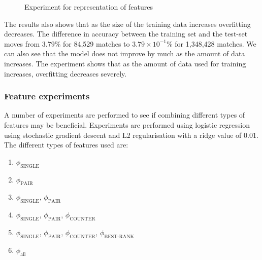 \begin{figure}[!htb]
  \centering
{}
  \caption{Experiment for representation of features}\label{fig:clusterbigdata}
\end{figure}

The results also shows that as the size of the training data increases overfitting decreases. The difference in accuracy between the training set and the test-set moves from $3.79\%$ for 84,529 matches to $3.79\times10^{-1} \%$ for 1,348,428 matches. We can also see that the model does not improve by much as the amount of data increases. The experiment shows that as the amount of data used for training increases, overfitting decreases severely.      


\subsubsection{Feature experiments}\label{sec:feattest}
A number of experiments are performed to see if combining different types of features may be beneficial.
Experiments are performed using logistic regression using stochastic gradient descent and L2 regularisation with a ridge value of 0.01. The different types of features used are:
\begin{enumerate}
\item $\phi_\text{SINGLE}$
\item $\phi_\text{PAIR}$
\item $\phi_\text{SINGLE}$, $\phi_\text{PAIR}$
\item $\phi_\text{SINGLE}$, $\phi_\text{PAIR}$, $\phi_\text{COUNTER}$
\item $\phi_\text{SINGLE}$, $\phi_\text{PAIR}$, $\phi_\text{COUNTER}$, $\phi_\text{BEST-RANK}$
\item $\phi_\text{all}$
\end{enumerate}

